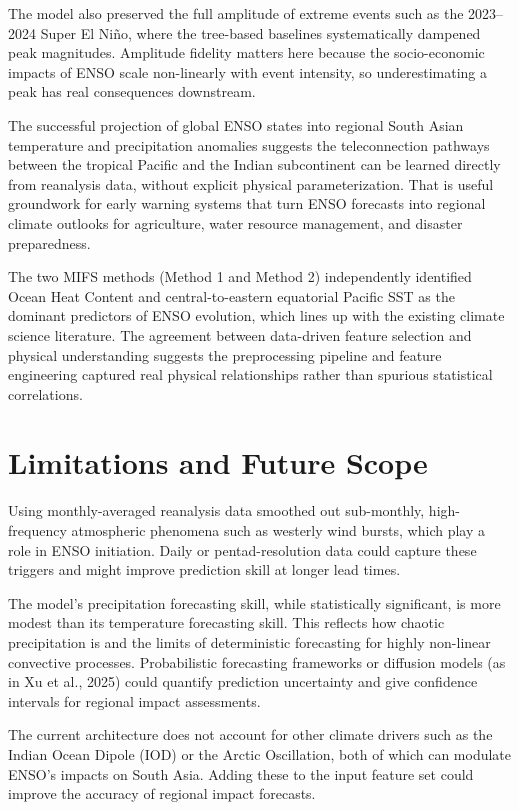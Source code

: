 The model also preserved the full amplitude of extreme events such as the 2023--2024 Super El Ni\~{n}o, where the tree-based baselines systematically dampened peak magnitudes. Amplitude fidelity matters here because the socio-economic impacts of ENSO scale non-linearly with event intensity, so underestimating a peak has real consequences downstream.

The successful projection of global ENSO states into regional South Asian temperature and precipitation anomalies suggests the teleconnection pathways between the tropical Pacific and the Indian subcontinent can be learned directly from reanalysis data, without explicit physical parameterization. That is useful groundwork for early warning systems that turn ENSO forecasts into regional climate outlooks for agriculture, water resource management, and disaster preparedness.

The two MIFS methods (Method 1 and Method 2) independently identified Ocean Heat Content and central-to-eastern equatorial Pacific SST as the dominant predictors of ENSO evolution, which lines up with the existing climate science literature. The agreement between data-driven feature selection and physical understanding suggests the preprocessing pipeline and feature engineering captured real physical relationships rather than spurious statistical correlations.

\section{Limitations and Future Scope}

Using monthly-averaged reanalysis data smoothed out sub-monthly, high-frequency atmospheric phenomena such as westerly wind bursts, which play a role in ENSO initiation. Daily or pentad-resolution data could capture these triggers and might improve prediction skill at longer lead times.

The model's precipitation forecasting skill, while statistically significant, is more modest than its temperature forecasting skill. This reflects how chaotic precipitation is and the limits of deterministic forecasting for highly non-linear convective processes. Probabilistic forecasting frameworks or diffusion models (as in Xu et al., 2025) could quantify prediction uncertainty and give confidence intervals for regional impact assessments.

The current architecture does not account for other climate drivers such as the Indian Ocean Dipole (IOD) or the Arctic Oscillation, both of which can modulate ENSO's impacts on South Asia. Adding these to the input feature set could improve the accuracy of regional impact forecasts.

